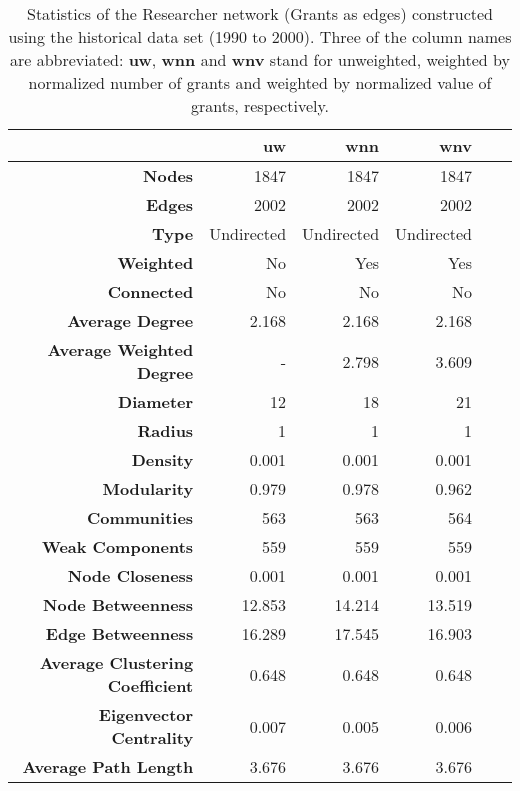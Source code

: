 \begin{table}[!htbp]
\centering
\caption[Statistics of the Researcher network (Grants as edges) constructed using the historical data set (1990 to 2000)]{Statistics of the Researcher network (Grants as edges) constructed using the historical data set (1990 to 2000). Three of the column names are abbreviated: \textbf{uw}, \textbf{wnn} and \textbf{wnv} stand for unweighted, weighted by normalized number of grants and weighted by normalized value of grants, respectively.}
\label{table:researcher_b_past1_stats_appendix}
\begin{tabular}{r|rrrrr}
\textbf{} & \textbf{uw} & \textbf{wnn} & \textbf{wnv}\\
\hline
\textbf{Nodes} & {1847} & {1847} & {1847}\\
\textbf{Edges} & {2002} & {2002} & {2002}\\
\textbf{Type} & {Undirected} & {Undirected} & {Undirected}\\
\textbf{Weighted} & {No} & {Yes} & {Yes}\\
\textbf{Connected} & {No} & {No} & {No}\\
\textbf{Average Degree} & {2.168} & {2.168} & {2.168}\\
\textbf{Average Weighted Degree} & {-} & {2.798} & {3.609}\\
\textbf{Diameter} & {12} & {18} & {21}\\
\textbf{Radius} & {1} & {1} & {1}\\
\textbf{Density} & {0.001} & {0.001} & {0.001}\\
\textbf{Modularity} & {0.979} & {0.978} & {0.962}\\
\textbf{Communities} & {563} & {563} & {564}\\
\textbf{Weak Components} & {559} & {559} & {559}\\
\textbf{Node Closeness} & {0.001} & {0.001} & {0.001}\\
\textbf{Node Betweenness} & {12.853} & {14.214} & {13.519}\\
\textbf{Edge Betweenness} & {16.289} & {17.545} & {16.903}\\
\textbf{Average Clustering Coefficient} & {0.648} & {0.648} & {0.648}\\
\textbf{Eigenvector Centrality} & {0.007} & {0.005} & {0.006}\\
\textbf{Average Path Length} & {3.676} & {3.676} & {3.676}
\end{tabular}
\end{table}

